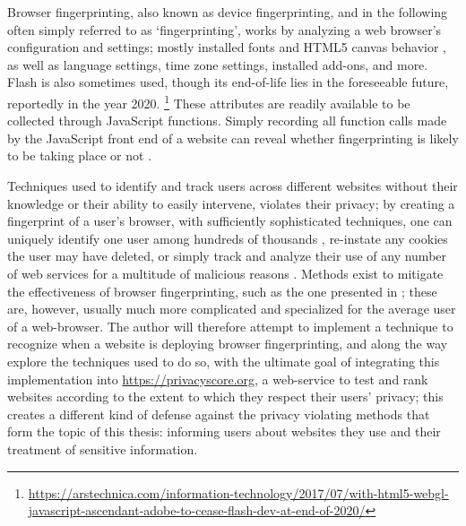 \documentclass[
    fontsize=12pt,
    headings=small,
    parskip=half,
    bibliography=totoc,
    numbers=noenddot,
    open=any
    ]{scrreprt}
\begin{document}

Browser fingerprinting, also known as device fingerprinting, and in the following often simply referred to as `fingerprinting',
works by analyzing a web browser's configuration and settings; mostly installed fonts and HTML5 canvas behavior
\cite{DBLP:conf/ccs/EnglehardtN16}, as well as
language settings, time zone settings, installed add-ons, and more. Flash is also sometimes used, though
its end-of-life lies in the foreseeable future, reportedly in the year 2020.
\footnote{\url{https://arstechnica.com/information-technology/2017/07/with-html5-webgl-javascript-ascendant-adobe-to-cease-flash-dev-at-end-of-2020/}}
These attributes are readily available to be collected through JavaScript functions. Simply recording
all function calls made by the JavaScript front end of a website can reveal whether fingerprinting is likely to
be taking place or not \cite{faiz2014browser, panopticlick}.

Techniques used to identify and track users across different websites without
their knowledge or their ability to easily intervene, violates their privacy; by creating a fingerprint
of a user's browser, with sufficiently sophisticated techniques, one can uniquely identify one user
among hundreds of thousands \cite{am_i_unique}, re-instate any cookies the user may have deleted,
or simply track and analyze their use of any number of web services for a multitude of malicious reasons \cite{eckersley2010unique}.
Methods exist to mitigate the effectiveness of browser fingerprinting, such as the one presented
in \cite{laperdrix2015mitigating};
these are, however, usually much more complicated and specialized for the average user of a web-browser.
The author will therefore attempt to implement a technique to recognize when a website is deploying browser fingerprinting,
and along the way explore the techniques used to do so, with the ultimate goal of integrating this implementation into
\url{https://privacyscore.org}, a web-service to test and rank websites according to the extent to which they
respect their users' privacy; this creates a different kind of defense against the privacy violating
methods that form the topic of this thesis: informing users about websites they use and their treatment of
sensitive information.
\end{document}

